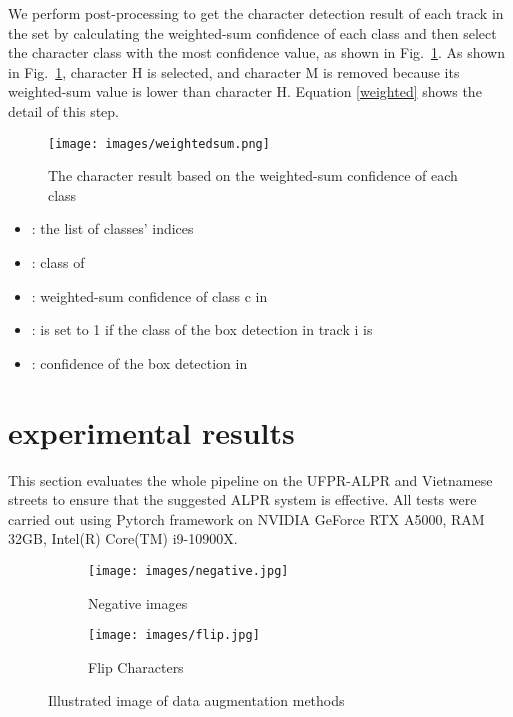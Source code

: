 \documentclass[conference]{IEEEtran}
\begin{document}
We perform post-processing to get the character detection result of each track in the set   by calculating the weighted-sum confidence of each class and then select the character class with the most confidence value, as shown in Fig.~\ref{weightsum}. As shown in Fig.~\ref{weightsum}, character H is selected, and character M is removed because its weighted-sum value is lower than character H. Equation \ref{weighted} shows the detail of this step.


\begin{figure}[htp]
  \centering
    \texttt{[image: images/weightedsum.png]}
  \caption{The character result based on the weighted-sum confidence of each class}
  \label{weightsum}
\end{figure}






\begin{itemize}[where:]
    \item : the list of classes' indices
    \item : class of 
    \item : weighted-sum confidence of class c in 
    \item : is set to 1 if the class of the  box detection in track i is 
\item : confidence of the  box detection in 
\end{itemize}




\section{experimental results}
This section evaluates the whole pipeline on the UFPR-ALPR and Vietnamese streets to ensure that the suggested ALPR system is effective. All tests were carried out using Pytorch framework on NVIDIA GeForce RTX A5000, RAM 32GB, Intel(R) Core(TM) i9-10900X.

\begin{figure}[htp]
  \centering
    \begin{subfigure}{0.45\columnwidth}
        \texttt{[image: images/negative.jpg]}
        \caption{Negative images} 
    \end{subfigure} 
\begin{subfigure}{0.45\columnwidth}
        \texttt{[image: images/flip.jpg]}
        \caption{Flip Characters} 
    \end{subfigure} 
    \caption{Illustrated image of data augmentation methods}
    \label{flipchar}
\end{figure}
\end{document}
